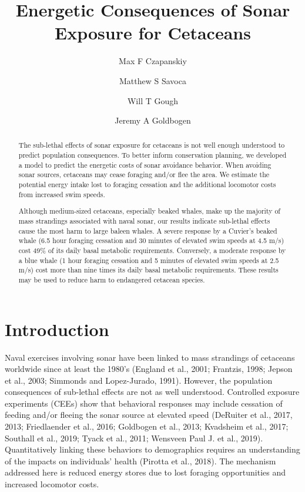 \documentclass[]{elsarticle} %
\begin{document}
\begin{frontmatter}

  \title{Energetic Consequences of Sonar Exposure for Cetaceans}
    \author[1]{Max F Czapanskiy}
    \author[1]{Matthew S Savoca}
  
  
    \author[1]{Will T Gough}
  
  
    \author[1]{Jeremy A Goldbogen}
  
  
      \address[1]{Department of Biology, Hopkins Marine Station, Stanford University, 120
Ocean View Boulevard, Pacific Grove, CA 93950, USA}
  
  \begin{abstract}
  The sub-lethal effects of sonar exposure for cetaceans is not well
  enough understood to predict population consequences. To better inform
  conservation planning, we developed a model to predict the energetic
  costs of sonar avoidance behavior. When avoiding sonar sources,
  cetaceans may cease foraging and/or flee the area. We estimate the
  potential energy intake lost to foraging cessation and the additional
  locomotor costs from increased swim speeds.
  
  Although medium-sized cetaceans, especially beaked whales, make up the
  majority of mass strandings associated with naval sonar, our results
  indicate sub-lethal effects cause the most harm to large baleen whales.
  A severe response by a Cuvier's beaked whale (6.5 hour foraging
  cessation and 30 minutes of elevated swim speeds at 4.5 m/s) cost 49\%
  of its daily basal metabolic requirements. Conversely, a moderate
  response by a blue whale (1 hour foraging cessation and 5 minutes of
  elevated swim speeds at 2.5 m/s) cost more than nine times its daily
  basal metabolic requirements. These results may be used to reduce harm
  to endangered cetacean species.
  \end{abstract}
  
 \end{frontmatter}

\section{Introduction}\label{introduction}

Naval exercises involving sonar have been linked to mass strandings of
cetaceans worldwide since at least the 1980's (England et al., 2001;
Frantzis, 1998; Jepson et al., 2003; Simmonds and Lopez-Jurado, 1991).
However, the population consequences of sub-lethal effects are not as
well understood. Controlled exposure experiments (CEEs) show that
behavioral responses may include cessation of feeding and/or fleeing the
sonar source at elevated speed (DeRuiter et al., 2017, 2013;
Friedlaender et al., 2016; Goldbogen et al., 2013; Kvadsheim et al.,
2017; Southall et al., 2019; Tyack et al., 2011; Wensveen Paul J. et
al., 2019). Quantitatively linking these behaviors to demographics
requires an understanding of the impacts on individuals' health (Pirotta
et al., 2018). The mechanism addressed here is reduced energy stores due
to lost foraging opportunities and increased locomotor costs.
\end{document}
